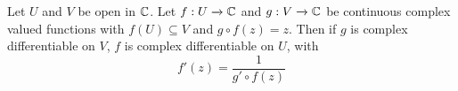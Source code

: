 \begin{lemma}\label{3.2.7}
    Let $U$ and  $V$ be open in  $\mathbb{C}$. Let  $f:U \xrightarrow{} \mathbb{C}$ and $g:V
    \xrightarrow{} \mathbb{C}$ be continuous complex valued functions with $f(U)
    \subseteq V$ and $g \circ f(z)=z$. Then if $g$ is complex differentiable on
    $V$, $f$ is complex differentiable on  $U$, with
    \begin{equation*}
        f'(z)=\frac{1}{g' \circ f(z)}
    \end{equation*}
\end{lemma}
